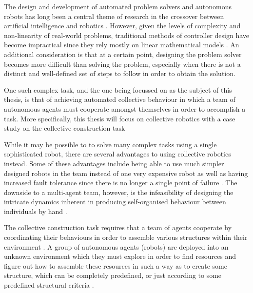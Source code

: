 
The design and development of automated problem solvers and autonomous robots has long been a central theme of research in the crossover between artificial intelligence and robotics \cite{RefWorks:33}. However, given the levels of complexity and non-linearity of real-world problems, traditional methods of controller design have become impractical since they rely mostly on linear mathematical models \cite{RefWorks:32}. An additional consideration is that at a certain point, designing the problem solver becomes more difficult than solving the problem, especially when there is not a distinct and well-defined set of steps to follow in order to obtain the solution.

One such complex task, and the one being focussed on as the subject of this thesis, is that of achieving automated collective behaviour in which a team of autonomous agents must cooperate amongst themselves in order to accomplish a task. More specifically, this thesis will focus on collective robotics with a case study on the collective construction task

While it may be possible to to solve many complex tasks using a single sophisticated robot, there are several advantages to using collective robotics instead. Some of these advantages include being able to use much simpler designed robots in the team instead of one very expensive robot as well as having increased fault tolerance since there is no longer a single point of failure \cite{chaimowicz2001architecture}. The downside to a multi-agent team, however, is the infeasibility of designing the intricate dynamics inherent in producing self-organised behaviour between individuals by hand \cite{RefWorks:11}.

The collective construction task requires that a team of agents cooperate by coordinating their behaviours in order to assemble various structures within their environment \cite{NitschkeSaEC2012}. A group of autonomous agents (robots) are deployed into an unknown environment which they must explore in order to find resources and figure out how to assemble these resources in such a way as to create some structure, which can be completely predefined, or just according to some predefined structural criteria \cite{NitschkeSaEC2012}.

